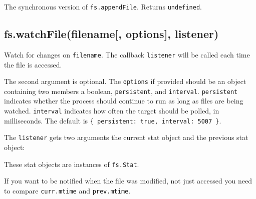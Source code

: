 The synchronous version of \texttt{fs.appendFile}. Returns
\texttt{undefined}.

\subsection{fs.watchFile(filename{[}, options{]},
listener)}\label{fs.watchfilefilename-options-listener}

\begin{Shaded}
\begin{Highlighting}[]
 \NormalTok{- }  \NormalTok{, } 
\end{Highlighting}
\end{Shaded}

Watch for changes on \texttt{filename}. The callback \texttt{listener}
will be called each time the file is accessed.

The second argument is optional. The \texttt{options} if provided should
be an object containing two members a boolean, \texttt{persistent}, and
\texttt{interval}. \texttt{persistent} indicates whether the process
should continue to run as long as files are being watched.
\texttt{interval} indicates how often the target should be polled, in
milliseconds. The default is
\texttt{\{\ persistent:\ true,\ interval:\ 5007\ \}}.

The \texttt{listener} gets two arguments the current stat object and the
previous stat object:

\begin{Shaded}
\begin{Highlighting}[]
\NormalTok{(}\NormalTok{, } 
  \NormalTok{(} \NormalTok{+ }\NormalTok{);}
  \NormalTok{(} \NormalTok{+ }\NormalTok{);}
\NormalTok{\});}
\end{Highlighting}
\end{Shaded}

These stat objects are instances of \texttt{fs.Stat}.

If you want to be notified when the file was modified, not just accessed
you need to compare \texttt{curr.mtime} and \texttt{prev.mtime}.

